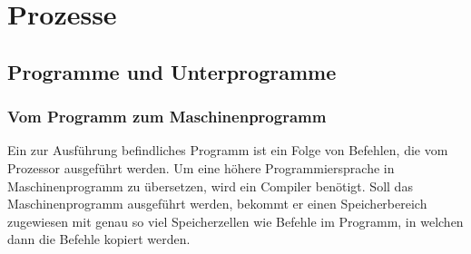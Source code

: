 \documentclass{article}
\begin{document}
\newpage
\section{Prozesse}
\subsection{Programme und Unterprogramme}
\subsubsection{Vom Programm zum Maschinenprogramm}
    Ein zur Ausführung befindliches Programm ist ein Folge von Befehlen, die vom Prozessor ausgeführt werden. Um eine höhere Programmiersprache in Maschinenprogramm zu übersetzen, wird ein Compiler benötigt. Soll das Maschinenprogramm ausgeführt werden, bekommt er einen Speicherbereich zugewiesen mit genau so viel Speicherzellen wie Befehle im Programm, in welchen dann die Befehle kopiert werden.  
\end{document}
